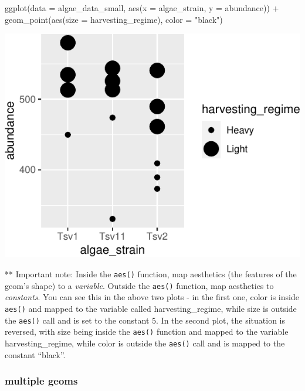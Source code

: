 \documentclass[
]{krantz}
\newenvironment{Shaded}{\begin{snugshade}}{\end{snugshade}}
\newcommand{\AttributeTok}[1]{\textcolor[rgb]{0.77,0.63,0.00}{#1}}
\newcommand{\FunctionTok}[1]{\textcolor[rgb]{0.00,0.00,0.00}{#1}}
\newcommand{\NormalTok}[1]{#1}
\newcommand{\SpecialCharTok}[1]{\textcolor[rgb]{0.00,0.00,0.00}{#1}}
\newcommand{\StringTok}[1]{\textcolor[rgb]{0.31,0.60,0.02}{#1}}
\begin{document}
\begin{Shaded}
\begin{Highlighting}[]
\FunctionTok{ggplot}\NormalTok{(}\AttributeTok{data =}\NormalTok{ algae\_data\_small, }\FunctionTok{aes}\NormalTok{(}\AttributeTok{x =}\NormalTok{ algae\_strain, }\AttributeTok{y =}\NormalTok{ abundance)) }\SpecialCharTok{+}
  \FunctionTok{geom\_point}\NormalTok{(}\FunctionTok{aes}\NormalTok{(}\AttributeTok{size =}\NormalTok{ harvesting\_regime), }\AttributeTok{color =} \StringTok{"black"}\NormalTok{)}
\end{Highlighting}
\end{Shaded}

\begin{center}\includegraphics[width=0.8\linewidth]{index_files/figure-latex/unnamed-chunk-26-1} \end{center}

** Important note: Inside the \texttt{aes()} function, map aesthetics (the features of the geom's shape) to a \emph{variable}. Outside the \texttt{aes()} function, map aesthetics to \emph{constants}. You can see this in the above two plots - in the first one, color is inside \texttt{aes()} and mapped to the variable called harvesting\_regime, while size is outside the \texttt{aes()} call and is set to the constant 5. In the second plot, the situation is reversed, with size being inside the \texttt{aes()} function and mapped to the variable harvesting\_regime, while color is outside the \texttt{aes()} call and is mapped to the constant ``black''.

\hypertarget{multiple-geoms}{%
\subsubsection{multiple geoms}\label{multiple-geoms}}
\end{document}
